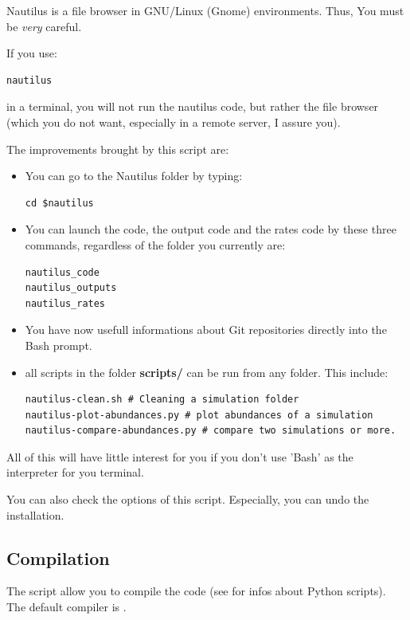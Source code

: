 \documentclass[english,a4paper,twoside]{article}
\begin{document}
\begin{attention}
Nautilus is a file browser in GNU/Linux (Gnome) environments. Thus, You must be \emph{very} careful. 

If you use:
\begin{verbatim}
nautilus
\end{verbatim}
in a terminal, you will not run the nautilus code, but rather the file browser (which you do not want, especially in a remote server, I assure you). 
\end{attention}

The improvements brought by this script are:
\begin{itemize}
\item You can go to the Nautilus folder by typing:
\begin{verbatim}
cd $nautilus
\end{verbatim}
\item You can launch the code, the output code and the rates code by these three commands, regardless of the folder you currently are:
\begin{verbatim}
nautilus_code
nautilus_outputs
nautilus_rates
\end{verbatim}
\item You have now usefull informations about Git repositories directly into the Bash prompt.
\item all scripts in the folder \textbf{scripts/} can be run from any folder. This include:
\begin{verbatim}
nautilus-clean.sh # Cleaning a simulation folder
nautilus-plot-abundances.py # plot abundances of a simulation
nautilus-compare-abundances.py # compare two simulations or more.
\end{verbatim}
\end{itemize}

\begin{remarque}
All of this will have little interest for you if you don't use 'Bash' as the interpreter for you terminal.

You can also check the options of this script. Especially, you can undo the installation.
\end{remarque}

\subsection{Compilation}
The script  allow you to compile the code (see  for infos about Python scripts). The default compiler is . 
\end{document}
